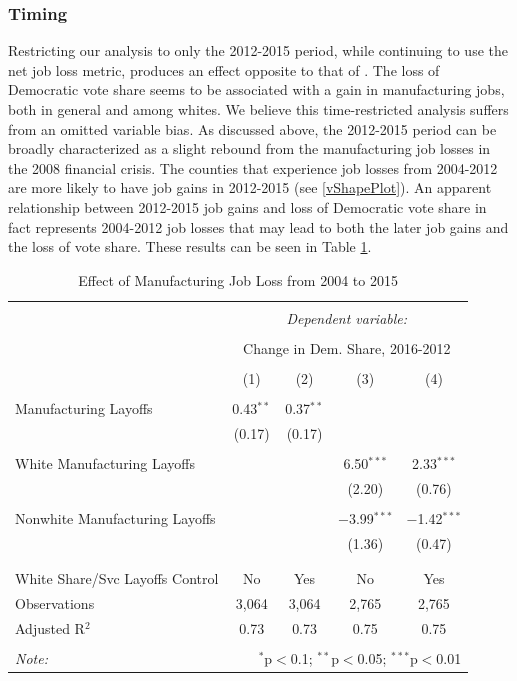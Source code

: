 \documentclass[]{AEA}
\begin{document}
\subsubsection{Timing}

Restricting our analysis to only the 2012-2015 period, while continuing
to use the net job loss metric, produces an effect opposite to that of
\cite{Baccini21}. The loss of Democratic vote share seems to be
associated with a gain in manufacturing jobs, both in general and among
whites. We believe this time-restricted analysis suffers from an omitted
variable bias. As discussed above, the 2012-2015 period can be broadly
characterized as a slight rebound from the manufacturing job losses in
the 2008 financial crisis. The counties that experience job losses from
2004-2012 are more likely to have job gains in 2012-2015 (see
\ref{vShapePlot}). An apparent relationship between 2012-2015 job gains
and loss of Democratic vote share in fact represents 2004-2012 job
losses that may lead to both the later job gains and the loss of vote
share. These results can be seen in Table \ref{regResult12}.
\FloatBarrier

\begin{table}[!htbp] \centering 
  \caption{Effect of Manufacturing Job Loss from 2004 to 2015} 
  \label{regResult12} 
\begin{tabular}{@{\extracolsep{5pt}}lcccc} 
\\[-1.8ex]\hline 
\hline \\[-1.8ex] 
 & \multicolumn{4}{c}{\textit{Dependent variable:}} \\ 
\cline{2-5} 
\\[-1.8ex] & \multicolumn{4}{c}{Change in Dem. Share, 2016-2012} \\ 
\\[-1.8ex] & (1) & (2) & (3) & (4)\\ 
\hline \\[-1.8ex] 
 Manufacturing Layoffs & 0.43$^{**}$ & 0.37$^{**}$ &  &  \\ 
  & (0.17) & (0.17) &  &  \\ 
  & & & & \\ 
 White Manufacturing Layoffs &  &  & 6.50$^{***}$ & 2.33$^{***}$ \\ 
  &  &  & (2.20) & (0.76) \\ 
  & & & & \\ 
 Nonwhite Manufacturing Layoffs &  &  & $-$3.99$^{***}$ & $-$1.42$^{***}$ \\ 
  &  &  & (1.36) & (0.47) \\ 
  & & & & \\ 
\hline \\[-1.8ex] 
White Share/Svc Layoffs Control & No & Yes & No & Yes \\ 
Observations & 3,064 & 3,064 & 2,765 & 2,765 \\ 
Adjusted R$^{2}$ & 0.73 & 0.73 & 0.75 & 0.75 \\ 
\hline 
\hline \\[-1.8ex] 
\textit{Note:}  & \multicolumn{4}{r}{$^{*}$p$<$0.1; $^{**}$p$<$0.05; $^{***}$p$<$0.01} \\ 
\end{tabular} 
\end{table} 
\FloatBarrier
\end{document}
